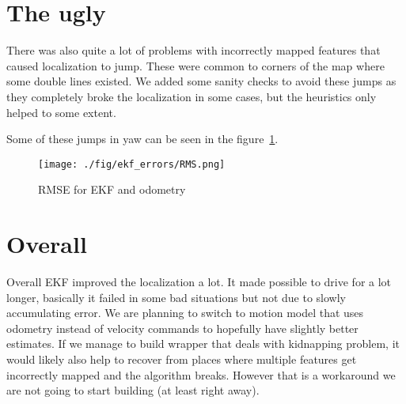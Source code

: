 \documentclass[12pt, a4paper, onecolumn]{article}
\begin{document}
\newpage
\section{The ugly}

There was also quite a lot of problems with incorrectly mapped features that caused localization to jump.
These were common to corners of the map where some double lines existed.
We added some sanity checks to avoid these jumps as they completely broke the localization in some cases, but the heuristics only helped to some extent.

Some of these jumps in yaw can be seen in the figure~\ref{fig:rmse}.

\begin{figure}[h!]
  \begin{center}
    \texttt{[image: ./fig/ekf\_errors/RMS.png]}
  \end{center}
  \caption{RMSE for EKF and odometry}
  \label{fig:rmse}
\end{figure}

\newpage
\section{Overall}
Overall EKF improved the localization a lot.
It made possible to drive for a lot longer, basically it failed in some bad situations but not due to slowly accumulating error.
We are planning to switch to motion model that uses odometry instead of velocity commands to hopefully have slightly better estimates.
If we manage to build wrapper that deals with kidnapping problem, it would likely also help to recover from places where multiple features get incorrectly
mapped and the algorithm breaks.
However that is a workaround we are not going to start building (at least right away).
\end{document}
